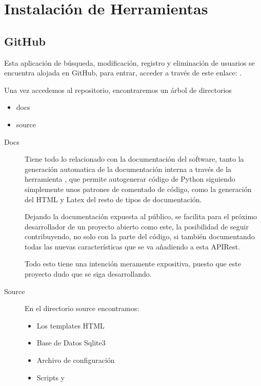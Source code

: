 \documentclass[letterpaper,10pt,spanish]{sphinxmanual}
\begin{document}
\chapter{Instalación de Herramientas}
\label{\detokenize{documentos/instalacion:instalacion-de-herramientas}}\label{\detokenize{documentos/instalacion::doc}}

\section{GitHub}
\label{\detokenize{documentos/instalacion:github}}
\sphinxAtStartPar
Esta aplicación de búsqueda, modificación, registro y eliminación de usuarios se encuentra alojada en GitHub, para
entrar, acceder a través de este enlace: .

\sphinxAtStartPar
Una vez accedemos al repositorio, encontraremos un árbol de directorios
\begin{itemize}
\item {} 
\sphinxAtStartPar
docs

\item {} 
\sphinxAtStartPar
source

\end{itemize}
\begin{description}
\item[{Docs}] \leavevmode
\sphinxAtStartPar
Tiene todo lo relacionado con la documentación del software, tanto la generación automatica de la documentación interna
a través de la herramienta , que permite auto\sphinxhyphen{}generar código de Python siguiendo simplemente unos patrones de comentado
de código, como la generación del HTML y Latex del resto de tipos de documentación.

\sphinxAtStartPar
Dejando la documentación expuesta al público, se facilita para el próximo desarrollador de un proyecto abierto como este, la posibilidad
de seguir contribuyendo, no solo con la parte del código, si también documentando todas las nuevas características que se va añadiendo a
esta APIRest.

\sphinxAtStartPar
Todo esto tiene una intención meramente expositiva, puesto que este proyecto dudo que se siga desarrollando.

\item[{Source}] \leavevmode
\sphinxAtStartPar
En el directorio source encontramos:
\begin{itemize}
\item {} 
\sphinxAtStartPar
Los templates HTML

\item {} 
\sphinxAtStartPar
Base de Datos Sqlite3

\item {} 
\sphinxAtStartPar
Archivo de configuración 

\item {} 
\sphinxAtStartPar
Scripts  y 

\end{itemize}

\end{description}
\end{document}
